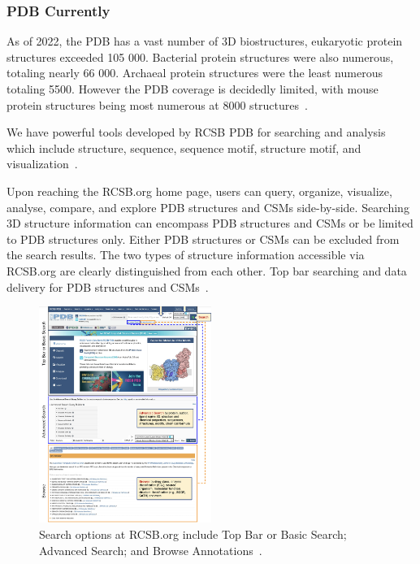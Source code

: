 \documentclass[]{final_report}
\begin{document}
\subsubsection{PDB Currently}

As of 2022, the PDB has a vast number of 3D biostructures, eukaryotic protein structures exceeded 105 000. Bacterial protein structures were also numerous, totaling nearly 66 000. Archaeal protein structures were the least numerous totaling 5500. However the PDB coverage is decidedly limited, with mouse protein structures being most numerous at 8000 structures~\cite{burley_open-access_2021}. 

We have powerful tools developed by RCSB PDB for searching and analysis which include structure, sequence, sequence motif, structure motif, and visualization~\cite{burley1_rcsb_2022}.

Upon reaching the RCSB.org home page, users can query, organize, visualize, analyse, compare, and explore PDB structures and CSMs side-by-side. Searching 3D structure information can encompass PDB structures and CSMs or be limited to PDB structures only. Either PDB structures or CSMs can be excluded from the search results. The two types of structure information accessible via RCSB.org are clearly distinguished from each other. Top bar searching and data delivery for PDB structures and CSMs~\cite{burley1_rcsb_2022}.

\begin{figure}[ht]
    \centering
    \includegraphics[width=0.5\textwidth]{PDB Site.png}
    \caption{\label{fig:PDB}Search options at RCSB.org include Top Bar or Basic Search; Advanced Search; and Browse Annotations~\cite{burley1_rcsb_2022}.}
\end{figure}
\end{document}
